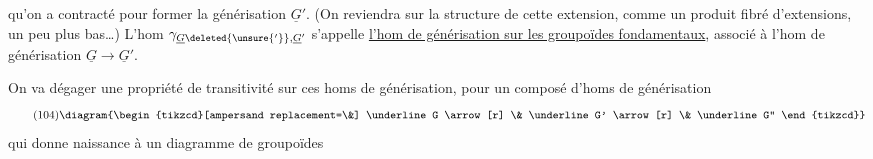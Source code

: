 qu'on a contracté pour former la générisation $\underline G'$.  (On reviendra sur la structure de cette extension, comme un produit fibré d'extensions, un peu plus bas\ldots) L'hom $\gamma_{\underline G\deleted{\unsure{'}},\underline G'}$ s'appelle \uline{l'hom de générisation sur les groupoïdes fondamentaux}, associé à l'hom de générisation $\underline G\to\underline G'$.

On va dégager une propriété de transitivité sur ces homs de générisation, pour un composé d'homs de générisation
\[
\tag{104}
\diagram{\begin{tikzcd}[ampersand replacement=\&]
\underline G \arrow[r] \& \underline G' \arrow[r] \& \underline G''
\end{tikzcd}}
\]
qui donne naissance à un diagramme de groupoïdes
